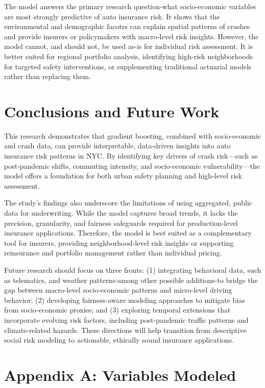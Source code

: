 \documentclass[
  number,
  review,
  3p]{elsarticle}
\begin{document}
The model answers the primary research question-what socio-economic
variables are most strongly predictive of auto insurance risk. It shows
that the environmental and demographic facotrs can explain spatial
patterns of crashes and provide insurers or policymakers with
macro-level risk insights. However, the model cannot, and should not, be
used as-is for individual risk assessment. It is better suited for
regional portfolio analysis, identifying high-risk neighborhoods for
targeted safety interventions, or supplementing traditional actuarial
models rather than replacing them.

\section{Conclusions and Future Work}\label{conclusions-and-future-work}

This research demonstrates that gradient boosting, combined with
socio-economic and crash data, can provide interpretable, data-driven
insights into auto insurance risk patterns in NYC. By identifying key
drivers of crash risk---such as post-pandemic shifts, commuting
intensity, and socio-economic vulnerability---the model offers a
foundation for both urban safety planning and high-level risk
assessment.

The study's findings also underscore the limitations of using
aggregated, public data for underwriting. While the model captures broad
trends, it lacks the precision, granularity, and fairness safeguards
required for production-level insurance applications. Therefore, the
model is best suited as a complementary tool for insurers, providing
neighborhood-level risk insights or supporting reinsurance and portfolio
management rather than individual pricing.

Future research should focus on three fronts: (1) integrating behavioral
data, such as telematics, and weather patterns-among other possible
additions-to bridge the gap between macro-level socio-economic patterns
and micro-level driving behavior; (2) developing fairness-aware modeling
approaches to mitigate bias from socio-economic proxies; and (3)
exploring temporal extensions that incorporate evolving risk factors,
including post-pandemic traffic patterns and climate-related hazards.
These directions will help transition from descriptive social risk
modeling to actionable, ethically sound insurance applications.

\section{Appendix A: Variables
Modeled}\label{appendix-a-variables-modeled}
\end{document}
